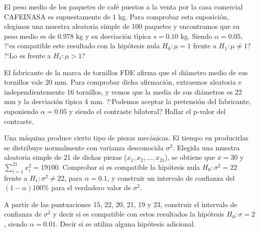 \begin{prob}%
    El peso medio de los paquetes de caf\'{e} puestos a la venta por
    la casa comercial CAFEINASA es supuestamente de 1 kg. Para comprobar
    esta suposici\'{o}n, elegimos una muestra aleatoria simple de 100
    paquetes y encontramos que su peso medio es de 0.978 kg y su
    desviaci\'{o}n t\'{\i}pica $\hat{s} = 0.10$ kg. Siendo $\alpha = 0.05$,
    ?`es compatible este resultado con la hip\'{o}tesis nula $H_{0}:
    \mu = 1$ frente a $H_{1}: \mu \not = 1$? ?`Lo es frente a $H_{1}:
    \mu > 1$?
\end{prob}

\begin{prob}%
    El fabricante de la marca de tornillos FDE afirma que el di\'{a}metro
    medio de sus tornillos vale 20 mm. Para comprobar dicha afirmaci\'{o}n,
    extraemos aleatoria e independientemente 16 tornillos, y vemos que
    la media de sus di\'{a}metros  es 22 mm y la desviaci\'{o}n t\'{\i}pica
    4 mm. ?`Podemos aceptar la pretensi\'{o}n del fabricante, suponiendo
    $\alpha = 0.05$ y siendo el contraste bilateral? Hallar el p-valor
    del contraste.
\end{prob}

\begin{prob}%
    Una m\'{a}quina produce cierto tipo de piezas mec\'{a}nicas. El
    tiempo en producirlas se distribuye normalmente con varianza
    desconocida $\sigma^2$. Elegida una muestra aleatoria simple de
    21 de dichas piezas ($x_{1}, x_{2}, \ldots, x_{21}$), se obtiene que
    $\overline{x} = 30$ y $\sum_{i=1}^{21} x_{i}^2 = 19100$. Comprobar
    si es compatible la hip\'{o}tesis nula $H_{0}: \sigma^2 = 22$ frente
    a $H_{1}: \sigma^2 \not = 22$, para $\alpha = 0.1$, y construir un
    intervalo de confianza del $(1 - \alpha)100\%$ para el verdadero
    valor de $\sigma^2$.
\end{prob}

\begin{prob}%
    A partir de las puntuaciones 15, 22, 20, 21, 19 y 23, construir el
    in\-ter\-va\-lo de confianza de $\sigma^2$ y decir si es compatible con
    estos resultados la hip\'{o}tesis $H_{0}: \sigma = 2$, siendo
    $\alpha = 0.01$. Decir si se utiliza alguna hip\'{o}tesis adicional.
\end{prob}

